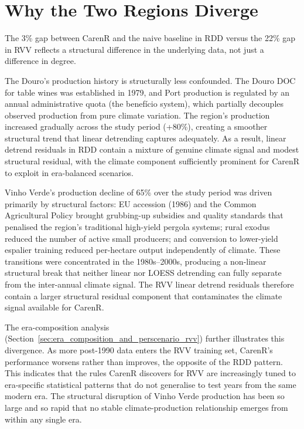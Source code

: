 \section{Why the Two Regions Diverge}\label{sec:why_the_two_regions}

The 3\% gap between CarenR and the naive baseline in RDD versus the 22\% gap in RVV reflects a structural difference in the underlying data, not just a difference in degree.

The Douro's production history is structurally less confounded. The Douro DOC for table wines was established in 1979, and Port production is regulated by an annual administrative quota (the benefício system), which partially decouples observed production from pure climate variation. The region's production increased gradually across the study period (+80\%), creating a smoother structural trend that linear detrending captures adequately. As a result, linear detrend residuals in RDD contain a mixture of genuine climate signal and modest structural residual, with the climate component sufficiently prominent for CarenR to exploit in era-balanced scenarios.

Vinho Verde's production decline of 65\% over the study period was driven primarily by structural factors: EU accession (1986) and the Common Agricultural Policy brought grubbing-up subsidies and quality standards that penalised the region's traditional high-yield pergola systems; rural exodus reduced the number of active small producers; and conversion to lower-yield espalier training reduced per-hectare output independently of climate. These transitions were concentrated in the 1980s--2000s, producing a non-linear structural break that neither linear nor LOESS detrending can fully separate from the inter-annual climate signal. The RVV linear detrend residuals therefore contain a larger structural residual component that contaminates the climate signal available for CarenR.

The era-composition analysis (Section~\ref{sec:era_composition_and_perscenario_rvv}) further illustrates this divergence. As more post-1990 data enters the RVV training set, CarenR's performance worsens rather than improves, the opposite of the RDD pattern. This indicates that the rules CarenR discovers for RVV are increasingly tuned to era-specific statistical patterns that do not generalise to test years from the same modern era. The structural disruption of Vinho Verde production has been so large and so rapid that no stable climate-production relationship emerges from within any single era.

